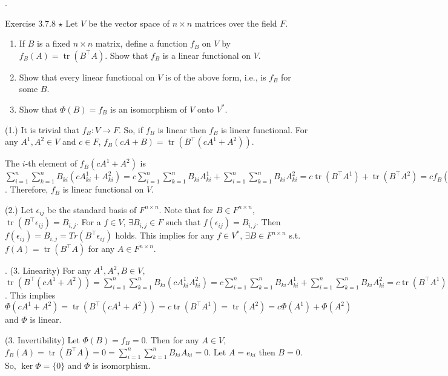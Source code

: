 \documentclass[8pt]{beamer}
\newcommand{\tr}{\operatorname{tr}}
\begin{document}
\begin{frame}{.}

    \begin{block}{Exercise 3.7.8 $\star$} 
        Let $V$ be the vector space of $n \times n$ matrices over the field $F$.
        \begin{enumerate}
            \item If $B$ is a fixed $n\times n$ matrix, define a function $f_B$ on $V$ by $f_B(A) = \tr(B^\top A)$.
            Show that $f_B$ is a linear functional on $V$.
            \item Show that every linear functional on $V$ is of the above form, i.e., is $f_B$ for some $B$.
            \item Show that $\Phi(B) = f_B$ is an isomorphism of $V$ onto $V^\ast$.
        \end{enumerate}

        (1.) It is trivial that $f_B: V \to F$.
        So, if $f_B$ is linear then $f_B$ is linear functional.
        For any $A^1, A^2 \in V$ and $c \in F$, $f_B(cA +B) = \tr(B^\top(cA^1+A^2))$.

        The $i$-th element of $f_B(cA^1+A^2)$ is $\sum_{i=1}^n \sum_{k=1}^n B_{ki} (cA^1_{ki} + A^2_{ki}) = c\sum_{i=1}^n\sum_{k=1}^n B_{ki}A^1_{ki} + \sum_{i=1}^n\sum_{k=1}^n B_{ki} A^2_{ki} = c\tr(B^\top A^1)+ \tr(B^\top A^2) = cf_B(A^1) +f_B(A^2)$.
        Therefore, $f_B$ is linear functional on $V$.

        \smallskip
        (2.) Let $\epsilon_{ij}$ be the standard basis of $F^{n\times n}$.
        Note that for $B \in F^{n\times n}$, $\tr(B^\top \epsilon_{ij}) = B_{i,j}$.
        For a $f \in V$, $\exists B_{i,j} \in F$ such that $f(\epsilon_{ij}) = B_{i,j}$.
        Then $f(\epsilon_{ij}) = B_{i,j} =Tr(B^\top \epsilon_{ij})$ holds.
        This implies for any $f \in V^\ast$, $\exists B \in F^{n \times n}$ s.t. $f(A) = \tr(B^\top A)$ for any $A \in F^{n \times n}$.
    \end{block}
\end{frame}

\begin{frame}{.}
    \smallskip
    (3. Linearity) For any $A^1, A^2, B \in V$, $\tr(B^\top(cA^1 + A^2)) = \sum_{i=1}^n \sum_{k=1}^n B_{ki} (cA^1_{ki} A^2_{ki}) = c\sum_{i=1}^n \sum_{k=1}^n B_{ki} A^1_{ki} + \sum_{i=1}^n \sum_{k=1}^n B_{ki} A^2_{ki} = c\tr(B^\top A^1) + \tr(B^\top A^2)$.
    This implies $\Phi(cA^1 + A^2) = \tr(B^\top(cA^1 + A^2)) = c\tr(B^\top A^1) = \tr(A^2) = c \Phi(A^1) + \Phi(A^2)$ and $\Phi$ is linear.

    (3. Invertibility) Let $\Phi(B) = f_B =0$.
    Then for any $A \in V$, $f_B(A) = \tr(B^\top A) = 0 = \sum_{i=1}^n \sum_{k=1}^n B_{ki} A_{ki} = 0$.
    Let $A = e_{ki}$ then $B = 0$.
    So, $\ker \Phi = \{0\}$ and $\Phi$ is isomorphism.

\end{frame}
\end{document}
